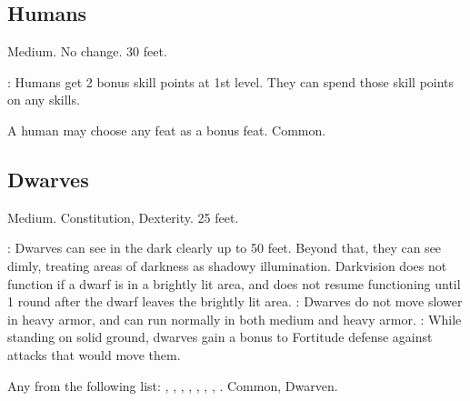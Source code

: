 \subsection{Humans}
 Medium.
 No change.
 30 feet.
\begin{itemize}
    : Humans get 2 bonus skill points at 1st level. They can spend those skill points on any skills.
\end{itemize}
 A human may choose any feat as a bonus feat.
 Common.

\subsection{Dwarves}
 Medium.
  Constitution,  Dexterity.
 25 feet.
\begin{itemize}
    : Dwarves can see in the dark clearly up to 50 feet.   Beyond that, they can see dimly, treating areas of darkness as shadowy illumination. Darkvision does not function if a dwarf is in a brightly lit area, and does not resume functioning until 1 round after the dwarf leaves the brightly lit area.
    : Dwarves do not move slower in heavy armor, and can run normally in both medium and heavy armor.
    : While standing on solid ground, dwarves gain a  bonus to Fortitude defense against attacks that would move them.
\end{itemize}
 Any from the following list: , , , , , , , .
 Common, Dwarven.

